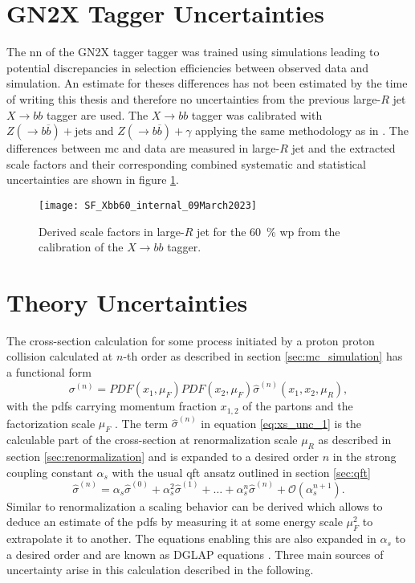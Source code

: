 \section{GN2X Tagger Uncertainties}
The \ac{nn} of the GN2X tagger tagger was trained using simulations leading to potential discrepancies in selection efficiencies between observed data and simulation. An estimate for theses differences has not been estimated by the time of writing this thesis and therefore no uncertainties from the previous large-$R$ jet $X\rightarrow bb$ \citep{ATL-PHYS-PUB-2020-019} tagger are used. The $X\rightarrow bb$ tagger was calibrated with $Z(\rightarrow b\overline{b})+\text{jets}$ and $Z(\rightarrow b\overline{b})+\gamma$ applying the same methodology as in \citep{ATL-PHYS-PUB-2021-035}. The differences between \ac{mc} and data are measured in large-$R$ jet \pt and the extracted scale factors and their corresponding combined systematic and statistical uncertainties are shown in figure \ref{fig:xbb_sf}.
\begin{figure}
    \centering
    \texttt{[image: SF\_Xbb60\_internal\_09March2023]}
    \caption[]{Derived scale factors in large-$R$ jet \pt for the  \qty[]{60}{\percent} \ac{wp} from the calibration of the $X\rightarrow bb$ tagger.}
    \label{fig:xbb_sf}
\end{figure}

\section{Theory Uncertainties}\label{sec:theory_uncertainties}
The cross-section calculation for some process initiated by a proton proton collision calculated at $n$-th order as described in section \ref{sec:mc_simulation} has a functional form
\begin{equation}
    \sigma^{(n)} = PDF(x_1, \mu_F)  PDF(x_2, \mu_F) \hat{\sigma}^{(n)}(x_1,x_2,\mu_R),
    \label{eq:xs_unc_1}
\end{equation}
with the \acfp{pdf} carrying momentum fraction $x_{1,2}$ of the partons and the factorization scale $\mu_F$ \citep{unc_recipe}. The term $\hat{\sigma}^{(n)}$ in equation \ref{eq:xs_unc_1} is the calculable part of the cross-section at renormalization scale $\mu_R$ as described in section \ref{sec:renormalization} and is expanded to a desired order $n$ in the strong coupling constant $\alpha_s$ with the usual \ac{qft} ansatz outlined in section \ref{sec:qft}
\begin{equation}
    \hat{\sigma}^{(n)} = \alpha_s \hat{\sigma}^{(0)} + \alpha_s^2 \hat{\sigma}^{(1)} + \ldots + \alpha_s^n \hat{\sigma}^{(n)} + \mathcal{O}(\alpha_s^{n+1}).
    \label{eq:xs_unc_2}
\end{equation}
Similar to renormalization a scaling behavior can be derived which allows to deduce an estimate of the \acp{pdf} by measuring it at some energy scale $\mu_F^2$ to extrapolate it to another. The equations enabling this are also expanded in $\alpha_s$ to a desired order and are known as DGLAP equations \citep{halzen1984introductory}. Three main sources of uncertainty arise in this calculation described in the following.

